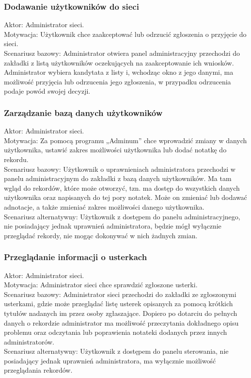 \documentclass[12pt,a4paper,notitlepage]{article}
\begin{document}
		\subsubsection{Dodawanie użytkowników do sieci}
Aktor: Administrator sieci.\\
Motywacja: Użytkownik chce zaakceptować lub odrzucić zgłoszenia o przyjęcie do sieci.\\
Scenariusz bazowy: Administrator otwiera panel administracyjny przechodzi do zakładki z listą użytkowników oczekujących na zaakceptowanie ich wniosków. Administrator wybiera kandytata z listy i, wchodząc okno z jego danymi, ma możliwość przyjęcia lub odrzucenia jego zgłoszenia, w przypadku odrzucenia podaje powód swojej decyzji.
		\subsubsection{Zarządzanie bazą danych użytkowników}
Aktor: Administrator sieci.\\
Motywacja: Za pomocą programu „Adminum” chce wprowadzić zmiany w danych użytkownika, ustawić zakres możliwości użytkownika lub dodać notatkę do rekordu.\\
Scenariusz bazowy: Użytkownik o uprawnieniach administratora przechodzi w panelu administracyjnym do zakładki z bazą danych użytkowników. Ma tam wgląd do rekordów, które może otworzyć, tzn.  ma dostęp do wszystkich danych użytkownika oraz napisanych do tej pory notatek. Może on zmieniać lub dodawać adnotacje, a także zmieniać zakres możliwości danego użytkownika.\\
Scenariusz alternatywny: Użytkownik z dostępem do panelu administracyjnego, nie posiadający jednak uprawnień administratora, będzie mógł wyłącznie przeglądać rekordy, nie mogąc dokonywać w nich żadnych zmian.	
		\subsubsection{Przeglądanie informacji o usterkach}
Aktor: Administrator sieci.\\
Motywacja: Administrator sieci chce sprawdzić zgłoszone usterki.\\
Scenariusz bazowy: Administrator sieci przechodzi do zakładki ze zgłoszonymi usterkami, gdzie może przeglądać listę usterek opisanych za pomocą krótkich tytułów nadanych im przez osoby zgłaszające. Dopiero po dotarciu do  pełnych danych o rekordzie administrator ma możliwość przeczytania dokładnego opisu problemu oraz odczytania lub poprawienia notateki dodanych przez innych administratorów.\\
Scenariusz alternatywny: Użytkownik z dostępem do panelu sterowania, nie posiadający jednak uprawnień administratora, ma wyłącznie możliwość przeglądania rekordów.
	
\end{document}
